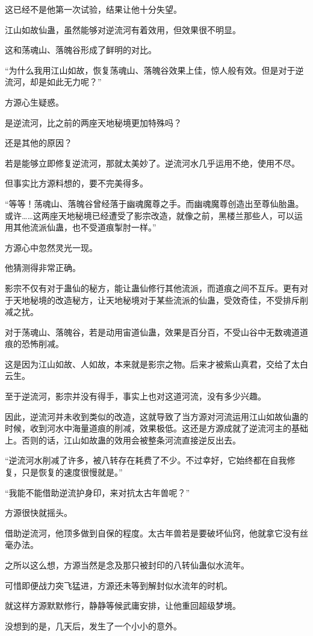 \begin{this_body}
这已经不是他第一次试验，结果让他十分失望。

江山如故仙蛊，虽然能够对逆流河有着效用，但效果很不明显。

这和荡魂山、落魄谷形成了鲜明的对比。

“为什么我用江山如故，恢复荡魂山、落魄谷效果上佳，惊人般有效。但是对于逆流河，却是如此无力呢？”

方源心生疑惑。

是逆流河，比之前的两座天地秘境更加特殊吗？

还是其他的原因？

若是能够立即修复逆流河，那就太美妙了。逆流河水几乎运用不绝，使用不尽。

但事实比方源料想的，要不完美得多。

“等等！荡魂山、落魄谷曾经落于幽魂魔尊之手。而幽魂魔尊创造出至尊仙胎蛊。或许……这两座天地秘境已经遭受了影宗改造，就像之前，黑楼兰那些人，可以运用其他流派仙蛊，也不受道痕掣肘一样。”

方源心中忽然灵光一现。

他猜测得非常正确。

影宗不仅有对于蛊仙的秘方，能让蛊仙修行其他流派，而道痕之间不互斥。更有对于天地秘境的改造秘方，让天地秘境对于某些流派的仙蛊，受效奇佳，不受排斥削减之扰。

对于荡魂山、落魄谷，若是动用宙道仙蛊，效果是百分百，不受山谷中无数魂道道痕的恐怖削减。

这是因为江山如故、人如故，本来就是影宗之物。后来才被紫山真君，交给了太白云生。

至于逆流河，影宗并没有得手，事实上也对这道河流，没有多少兴趣。

因此，逆流河并未收到类似的改造，这就导致了当方源对河流运用江山如故仙蛊的时候，收到河水中海量道痕的削减，效果极低。这还是方源成就了逆流河主的基础上。否则的话，江山如故蛊的效用会被整条河流直接逆反出去。

“逆流河水削减了许多，被八转存在耗费了不少。不过幸好，它始终都在自我修复，只是恢复的速度很慢就是。”

“我能不能借助逆流护身印，来对抗太古年兽呢？”

方源很快就摇头。

借助逆流河，他顶多做到自保的程度。太古年兽若是要破坏仙窍，他就拿它没有丝毫办法。

之所以这么想，方源当然是念及那只被封印的八转仙蛊似水流年。

可惜即便战力突飞猛进，方源还未等到解封似水流年的时机。

就这样方源默默修行，静静等候武庸安排，让他重回超级梦境。

没想到的是，几天后，发生了一个小小的意外。

\end{this_body}

